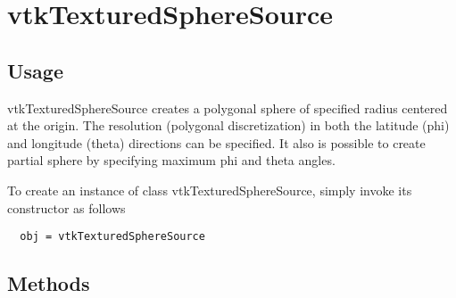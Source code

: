 \section{vtkTexturedSphereSource}

\subsection{Usage}

 vtkTexturedSphereSource creates a polygonal sphere of specified radius 
 centered at the origin. The resolution (polygonal discretization) in both 
 the latitude (phi) and longitude (theta) directions can be specified. 
 It also is possible to create partial sphere by specifying maximum phi and 
 theta angles.

To create an instance of class vtkTexturedSphereSource, simply
invoke its constructor as follows
\begin{verbatim}
  obj = vtkTexturedSphereSource
\end{verbatim}
\subsection{Methods}

